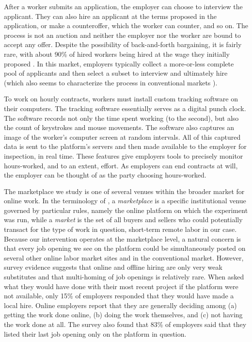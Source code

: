 \documentclass[12pt]{article}
\begin{document}
After a worker submits an application, the employer can choose to interview the applicant.
They can also hire an applicant at the terms proposed in the application, or make a counteroffer, which the worker can counter, and so on.
The process is not an auction and neither the employer nor the worker are bound to accept any offer. 
Despite the possibility of back-and-forth bargaining, it is fairly rare, with about 90\% of hired workers being hired at the wage they initially proposed \citep{barach2016info}.
In this market, employers typically collect a more-or-less complete pool of applicants and then select a subset to interview and ultimately hire (which also seems to characterize the process in conventional markets \citep{davis2021}).

To work on hourly contracts, workers must install custom tracking software on their computers. 
The tracking software essentially serves as a digital punch clock.
The software records not only the time spent working (to the second), but also the count of keystrokes and mouse movements.
The software also captures an image of the worker's computer screen at random intervals.
All of this captured data is sent to the platform's servers and then made available to the employer for inspection, in real time.
These features give employers tools to precisely monitor hours-worked, and to an extent, effort.
As employers can end contracts at will, the employer can be thought of as the party choosing hours-worked.

The marketplace we study is one of several venues within the broader market for online work. In the terminology of \cite{roth2018}, a \emph{marketplace} is a specific institutional venue governed by particular rules, namely the online platform on which the experiment was run, while a \emph{market} is the set of all buyers and sellers who could potentially transact for the type of work in question, short-term remote labor in our case. Because our intervention operates at the marketplace level, a natural concern is that every job opening we see on the platform could be simultaneously posted on several other online labor market sites and in the conventional market.
However, survey evidence suggests that online and offline hiring are only very weak substitutes and that multi-homing of job openings is relatively rare.
When asked what they would have done with their most recent project if the platform were not available, only 15\% of employers responded that they would have made a local hire.
Online employers report that they are generally deciding among (a) getting the work done online, (b) doing the work themselves, and (c) not having the work done at all.
The survey also found that 83\% of employers said that they listed their last job opening only on the platform in question. 
\end{document}
